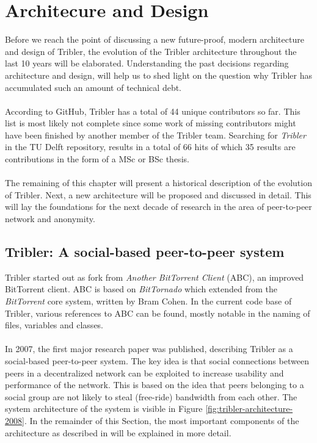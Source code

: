\chapter{Architecure and Design}
\label{chapter:architecture}

Before we reach the point of discussing a new future-proof, modern architecture and design of Tribler, the evolution of the Tribler architecture  throughout the last 10 years will be elaborated. Understanding the past decisions regarding architecture and design, will help us to shed light on the question why Tribler has accumulated such an amount of technical debt.\\\\
According to GitHub, Tribler has a total of 44 unique contributors so far. This list is most likely not complete since some work of missing contributors might have been finished by another member of the Tribler team. Searching for \emph{Tribler} in the TU Delft repository, results in a total of 66 hits of which 35 results are contributions in the form of a MSc or BSc thesis.\\\\
The remaining of this chapter will present a historical description of the evolution of Tribler. Next, a new architecture will be proposed and discussed in detail. This will lay the foundations for the next decade of research in the area of peer-to-peer network and anonymity.

\section{Tribler: A social-based peer-to-peer system}
Tribler started out as fork from \emph{Another BitTorrent Client} (ABC), an improved BitTorrent client. ABC is based on \emph{BitTornado} which extended from the \emph{BitTorrent} core system, written by Bram Cohen. In the current code base of Tribler, various references to ABC can be found, mostly notable in the naming of files, variables and classes.\\\\
In 2007, the first major research paper was published, describing Tribler as a social-based peer-to-peer system\cite{pouwelse2008tribler}. The key idea is that social connections between peers in a decentralized network can be exploited to increase usability and performance of the network. This is based on the idea that peers belonging to a social group are not likely to steal (free-ride) bandwidth from each other. The system architecture of the system is visible in Figure \ref{fig:tribler-architecture-2008}. In the remainder of this Section, the most important components of the architecture as described in \cite{pouwelse2008tribler} will be explained in more detail.

